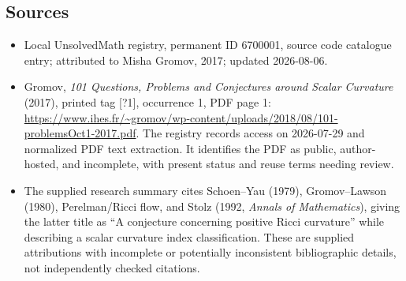 \documentclass[11pt]{article}
\begin{document}
\subsection{Sources}
\begin{itemize}
\item Local UnsolvedMath registry, permanent ID 6700001, source code catalogue entry; attributed to Misha Gromov, 2017; updated 2026-08-06.
\item Gromov, \emph{101 Questions, Problems and Conjectures around Scalar Curvature} (2017), printed tag [?1], occurrence 1, PDF page 1: \url{https://www.ihes.fr/~gromov/wp-content/uploads/2018/08/101-problemsOct1-2017.pdf}. The registry records access on 2026-07-29 and normalized PDF text extraction. It identifies the PDF as public, author-hosted, and incomplete, with present status and reuse terms needing review.
\item The supplied research summary cites Schoen--Yau (1979), Gromov--Lawson (1980), Perelman/Ricci flow, and Stolz (1992, \emph{Annals of Mathematics}), giving the latter title as ``A conjecture concerning positive Ricci curvature'' while describing a scalar curvature index classification. These are supplied attributions with incomplete or potentially inconsistent bibliographic details, not independently checked citations.
\end{itemize}
\end{document}
